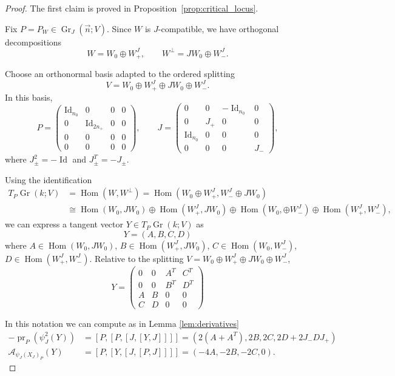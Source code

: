 \documentclass[10pt,a4paper]{amsart}
\def\A{\mathcal{A}}
\def\Gr{\operatorname{Gr}}
\def\Hom{\operatorname{Hom}}
\def\Id{\operatorname{Id}}
\def\pr{\operatorname{pr}}
\begin{document}
\begin{proof}
The first claim is proved in Proposition~\ref{prop:critical_locus}. 

Fix $P=P_W\in \Gr_J(\vec n;V)$. Since $W$ is $J$-compatible, we have orthogonal decompositions
\[
W=W_0\oplus W_+^J,\qquad W^\perp=JW_0\oplus W_-^J.
\]

\smallskip
Choose an orthonormal basis adapted to the ordered splitting
\[
V = W_0\oplus W_+^J\oplus JW_0\oplus W_-^J.
\]
In this basis,
\[
P=
\begin{pmatrix}
\Id_{n_0} & 0 & 0 & 0\\
0 & \Id_{2n_+} & 0 & 0\\
0 & 0 & 0 & 0\\
0 & 0 & 0 & 0
\end{pmatrix},
\qquad
J=
\begin{pmatrix}
0 & 0 & -\Id_{n_0} & 0\\
0 & J_+ & 0 & 0\\
\Id_{n_0} & 0 & 0 & 0\\
0 & 0 & 0 & J_-
\end{pmatrix},
\]
where $J_\pm^2=-\Id$ and $J_\pm^T=-J_\pm$. 
\smallskip

Using the identification
\begin{align*}
    T_P\Gr(k; V) &= \Hom(W, W^\perp) = \Hom(W_0 \oplus W_+^J, W_-^J\oplus JW_0)\\ &\cong \Hom(W_0, JW_0) \oplus \Hom(W_+^J, JW_0) \oplus \Hom(W_0, \oplus W_-^J) \oplus \Hom(W_+^J, W_-^J),
\end{align*}
we can express a tangent vector $Y \in T_P\Gr(k; V)$ as
\[ Y = (A, B, C, D)\]
where $A\in\Hom(W_0,JW_0)$, $B\in\Hom(W_+^J,JW_0)$, $C\in\Hom(W_0,W_-^J)$, $D\in\Hom(W_+^J,W_-^J)$.
Relative to the splitting $V=W_0\oplus W_+^J\oplus JW_0\oplus W_-^J$,
\[
Y=
\begin{pmatrix}
0 & 0 & A^T & C^T\\
0 & 0 & B^T & D^T\\ 
A & B & 0 & 0\\
C & D & 0 & 0
\end{pmatrix}
\]

\smallskip

In this notation we can compute as in Lemma \ref{lem:derivatives}
\begin{align*}
 -\pr_P(\psi_J^2(Y)) &= [P, [P, [J, [Y, J]]]] = (2(A + A^T), 2B, 2C, 2D + 2J_- D J_+)\\
\A_{\psi_J(X_J)_P}(Y) &= [P, [Y, [J, [P, J]]]] = (-4A, -2B, -2C, 0).\end{align*}


\end{proof}
\end{document}

